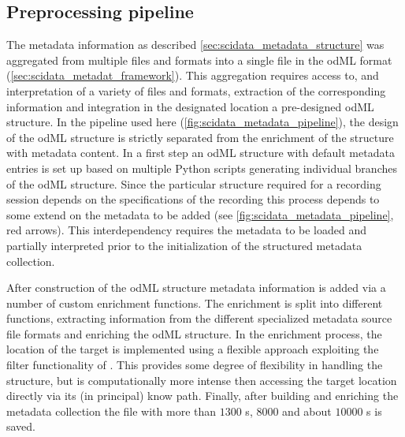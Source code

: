 \subsection{Preprocessing pipeline}
\label{sec:r2g_preprocessing_pipeline}
The metadata information as described \cref{sec:scidata_metadata_structure} was aggregated from multiple files and formats into a single file in the odML format (\cref{sec:scidata_metadat_framework}). This aggregation requires access to, and interpretation of a variety of files and formats, extraction of the corresponding information and integration in the designated location a pre-designed odML structure. In the pipeline used here (\cref{fig:scidata_metadata_pipeline}), the design of the odML structure is strictly separated from the enrichment of the structure with metadata content. In a first step an odML structure with default metadata entries is set up based on multiple Python scripts generating individual branches of the odML structure. Since the particular structure required for a recording session depends on the specifications of the recording this process depends to some extend on the metadata to be added (see \cref{fig:scidata_metadata_pipeline}, red arrows). This interdependency requires the metadata to be loaded and partially interpreted prior to the initialization of the structured metadata collection.

After construction of the odML structure metadata information is added via a number of custom enrichment functions. The enrichment is split into different functions, extracting information from the different specialized metadata source file formats and enriching the odML structure. In the enrichment process, the location of the target  is implemented using a flexible approach exploiting the filter functionality of . This provides some degree of flexibility in handling the  structure, but is computationally more intense then accessing the target location directly via its (in principal) know path. Finally, after building and enriching the metadata collection the  file with more than $1300$ s, $8000$  and about $10000$ s is saved.

